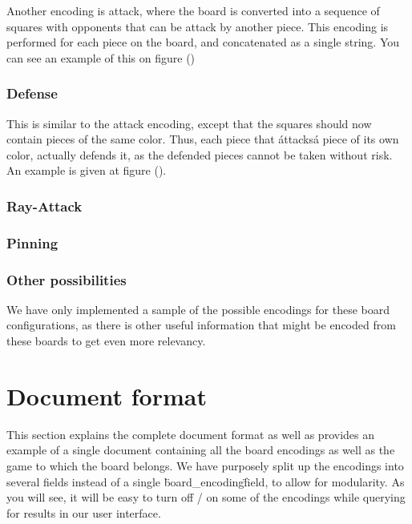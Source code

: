 \documentclass[11pt]{article}
\begin{document}
    Another encoding is attack, where the board is converted into a sequence of squares with opponents that can be attack by another piece. This encoding is performed for each piece on the board, and concatenated as a single string. You can see an example of this on figure ()

    \subsubsection{Defense}

    This is similar to the attack encoding, except that the squares should now contain pieces of the same color. Thus, each piece that \'attacks\' a piece of its own color, actually defends it, as the defended pieces cannot be taken without risk. An example is given at figure ().

    \subsubsection{Ray-Attack}

    \subsubsection{Pinning}

    \subsubsection{Other possibilities}

    We have only implemented a sample of the possible encodings for these board configurations, as there is other useful information that might be encoded from these boards to get even more relevancy.



    \section{Document format}\label{sec:documentformat}


    This section explains the complete document format as well as provides an example of a single document containing all the board encodings as well as the game to which the board belongs. We have purposely split up the encodings into several fields instead of a single \"board\_encoding\" field, to allow for modularity. As you will see, it will be easy to turn off / on some of the encodings while querying for results in our user interface.
\end{document}
